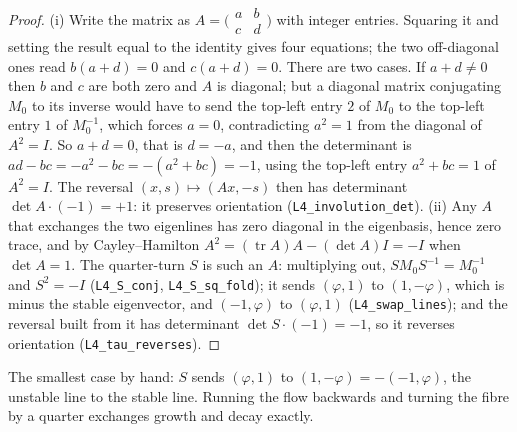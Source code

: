 \begin{proof}
(i) Write the matrix as $A=\bigl(\begin{smallmatrix}a&b\\c&d\end{smallmatrix}\bigr)$
with integer entries. Squaring it and setting the result equal to the
identity gives four equations; the two off-diagonal ones read
$b(a+d)=0$ and $c(a+d)=0$. There are two cases. If $a+d\neq0$ then $b$ and
$c$ are both zero and $A$ is diagonal; but a diagonal matrix conjugating
$M_{0}$ to its inverse would have to send the top-left entry $2$ of $M_{0}$
to the top-left entry $1$ of $M_{0}^{-1}$, which forces $a=0$, contradicting
$a^{2}=1$ from the diagonal of $A^{2}=I$. So $a+d=0$, that is $d=-a$, and then
the determinant is $ad-bc=-a^{2}-bc=-(a^{2}+bc)=-1$, using the top-left
entry $a^{2}+bc=1$ of $A^{2}=I$. The reversal $(x,s)\mapsto(Ax,-s)$ then has
determinant $\det A\cdot(-1)=+1$: it preserves orientation
(\texttt{L4\_involution\_det}). (ii) Any $A$ that exchanges the two
eigenlines has zero diagonal in the eigenbasis, hence zero trace, and by
Cayley--Hamilton $A^{2}=(\operatorname{tr}A)A-(\det A)I=-I$ when
$\det A=1$. The quarter-turn $S$ is such an $A$: multiplying out,
$SM_{0}S^{-1}=M_{0}^{-1}$ and $S^{2}=-I$ (\texttt{L4\_S\_conj},
\texttt{L4\_S\_sq\_fold}); it sends $(\varphi,1)$ to $(1,-\varphi)$, which is
minus the stable eigenvector, and $(-1,\varphi)$ to $(\varphi,1)$
(\texttt{L4\_swap\_lines}); and the reversal built from it has determinant
$\det S\cdot(-1)=-1$, so it reverses orientation
(\texttt{L4\_tau\_reverses}). \rigR
\end{proof}

The smallest case by hand: $S$ sends $(\varphi,1)$ to $(1,-\varphi)=-(-1,\varphi)$,
the unstable line to the stable line. Running the flow backwards and turning
the fibre by a quarter exchanges growth and decay exactly.

